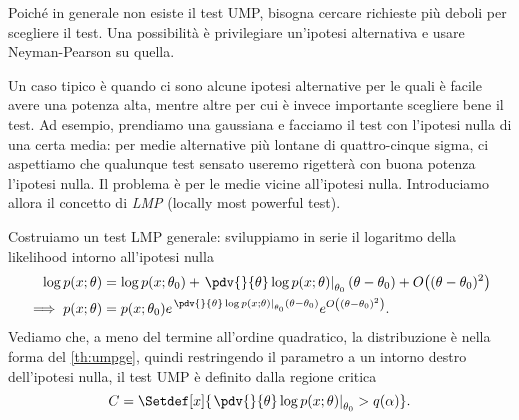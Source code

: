 
Poiché in generale non esiste il test UMP,
bisogna cercare richieste più deboli per scegliere il test.
Una possibilità è privilegiare un'ipotesi alternativa
e usare Neyman-Pearson su quella.

Un caso tipico è quando ci sono alcune ipotesi alternative
per le quali è facile avere una potenza alta,
mentre altre per cui è invece importante scegliere bene il test.
Ad esempio, prendiamo una gaussiana e facciamo il test con l'ipotesi nulla di una certa media:
per medie alternative più lontane di quattro-cinque sigma,
ci aspettiamo che qualunque test sensato useremo rigetterà con buona potenza l'ipotesi nulla.
Il problema è per le medie vicine all'ipotesi nulla.
Introduciamo allora il concetto di \emph{LMP} (locally most powerful test).

Costruiamo un test LMP generale:
sviluppiamo in serie il logaritmo della likelihood intorno all'ipotesi nulla
\begin{align*}
	\log p(x;\theta)
	&= \log p(x;\theta_0)
	+ \left.\pdv{}{\theta} \log p(x;\theta)\right|_{\theta_0} (\theta-\theta_0)
	+ O\big((\theta-\theta_0)^2\big) \\
	\implies p(x;\theta)
	&= p(x;\theta_0)
	e^{\left.\pdv{}{\theta} \log p(x;\theta)\right|_{\theta_0} (\theta-\theta_0)}
	e^{O\left((\theta-\theta_0)^2\right)}.
\end{align*}
Vediamo che, a meno del termine all'ordine quadratico,
la distribuzione è nella forma del \autoref{th:umpge},
quindi restringendo il parametro a un intorno destro dell'ipotesi nulla,
il test UMP è definito dalla regione critica
\begin{equation*}
	C = \Setdef[x]{\left.\pdv{}{\theta} \log p(x;\theta)\right|_{\theta_0} > q(\alpha)}.
\end{equation*}


